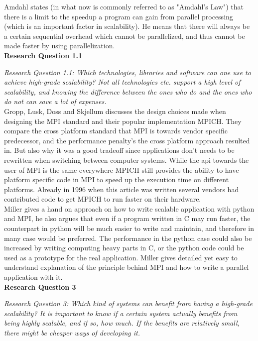 \documentclass{article}
\begin{document}
Amdahl \cite{amdahl1967validity} states (in what now is commonly referred to as
"Amdahl's Law") that there is a limit to the speedup a program can gain from
parallel processing (which is an important factor in scalability).  He means
that there will always be a certain sequential overhead which cannot be
parallelized, and thus cannot be made faster by using parallelization.
\\

\noindent\textbf{Research Question 1.1}

{\scriptsize \emph{Research Question 1.1: Which technologies, libraries and
software can one use to achieve high-grade scalability? Not all technologies
etc. support a high level of scalability, and knowing the difference between
the ones who do and the ones who do not can save a lot of expenses.}}
\\

Gropp, Lusk, Doss and Skjellum\cite{gropp1996high} discusses the design choices made when
designing the MPI standard and their popular implementation MPICH. They
compare the cross platform standard that MPI is towards vendor specific
predecessor, and the performance penalty's the cross platform approach resulted
in. But also why it was a good tradeoff since applications don't needs to be
rewritten when switching between computer systems. While the api towards
the user of MPI is the same everywhere MPICH still provides the ability to
have platform specific code in MPI to speed up the execution time on different
platforms. Already in 1996 when this article was written several vendors
had contributed code to get MPICH to run faster on their hardware.
\\

Miller \cite{millerparallel}\cite{miller2002pympi} gives a hand on approach on
how to write scalable application with python and MPI, he also argues that
even if a program written in C may run faster, the counterpart in python will
be much easier to write and maintain, and therefore in many case would be
preferred. The performance in the python case could also be increased by
writing computing heavy parts in C, or the python code could be used as a 
prototype for the real application. Miller gives detailed yet easy to 
understand explanation of the principle behind MPI and how to write a
parallel application with it.
\\

\noindent\textbf{Research Question 3}

{\scriptsize \emph{Research Question 3: Which kind of systems can benefit from
having a high-grade scalability? It is important to know if a certain system
actually benefits from being highly scalable, and if so, how much. If the
benefits are relatively small, there might be cheaper ways of developing it.}}
\\
\end{document}
